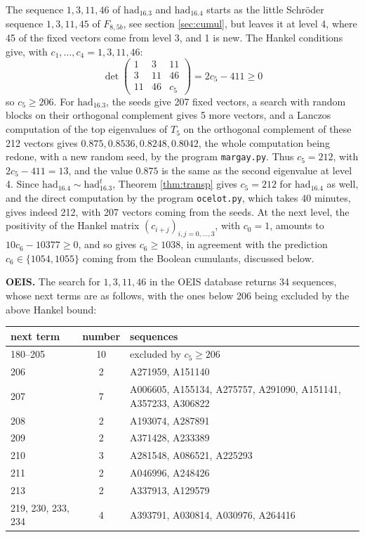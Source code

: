 \documentclass[11pt]{amsart}
\begin{document}
The sequence $1,3,11,46$ of $\mathrm{had}_{16.3}$ and $\mathrm{had}_{16.4}$ starts as the little Schr\"oder sequence $1,3,11,45$ of $F_{8,5b}$, see section \ref{sec:cumul}, but leaves it at level 4, where 45 of the fixed vectors come from level 3, and 1 is new. The Hankel conditions give, with $c_1,\ldots,c_4=1,3,11,46$:
$$\det\begin{pmatrix}1&3&11\\3&11&46\\11&46&c_5\end{pmatrix}=2c_5-411\geq0$$
so $c_5\geq206$. For $\mathrm{had}_{16.3}$, the seeds give 207 fixed vectors, a search with random blocks on their orthogonal complement gives 5 more vectors, and a Lanczos computation of the top eigenvalues of $T_5$ on the orthogonal complement of these 212 vectors gives $0.875,0.8536,0.8248,0.8042$, the whole computation being redone, with a new random seed, by the program \texttt{margay.py}. Thus $c_5=212$, with $2c_5-411=13$, and the value $0.875$ is the same as the second eigenvalue at level 4. Since $\mathrm{had}_{16.4}\sim\mathrm{had}_{16.3}^t$, Theorem \ref{thm:transp} gives $c_5=212$ for $\mathrm{had}_{16.4}$ as well, and the direct computation by the program \texttt{ocelot.py}, which takes 40 minutes, gives indeed 212, with 207 vectors coming from the seeds. At the next level, the positivity of the Hankel matrix $(c_{i+j})_{i,j=0,\ldots,3}$, with $c_0=1$, amounts to $10c_6-10377\geq0$, and so gives $c_6\geq1038$, in agreement with the prediction $c_6\in\{1054,1055\}$ coming from the Boolean cumulants, discussed below.

\medskip

\noindent\textbf{OEIS.} The search for $1,3,11,46$ in the OEIS database returns 34 sequences, whose next terms are as follows, with the ones below 206 being excluded by the above Hankel bound:

\medskip

\begin{center}
\begin{tabular}{lc>{\raggedright\arraybackslash}p{7.5cm}}
\toprule
next term & number & sequences\\
\midrule
180--205 & 10 & excluded by $c_5\geq206$\\
206 & 2 & A271959, A151140\\
207 & 7 & A006605, A155134, A275757, A291090, A151141, A357233, A306822\\
208 & 2 & A193074, A287891\\
209 & 2 & A371428, A233389\\
210 & 3 & A281548, A086521, A225293\\
211 & 2 & A046996, A248426\\
213 & 2 & A337913, A129579\\
219, 230, 233, 234 & 4 & A393791, A030814, A030976, A264416\\
\bottomrule
\end{tabular}
\end{center}
\end{document}
